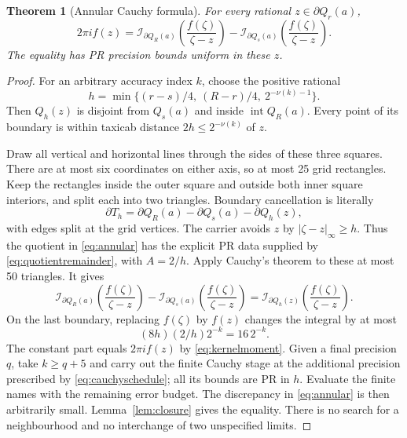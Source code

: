 \documentclass[11pt]{article}
\newtheorem{theorem}{Theorem}[section]
\theoremstyle{definition}
\newcommand{\Int}{\mathcal I}
\newcommand{\bd}{\partial}
\begin{document}
\begin{theorem}[Annular Cauchy formula]\label{thm:annular}
For every rational \(z\in\bd Q_r(a)\),
\begin{equation}\label{eq:annular}
 2\pi i f(z)=
 \Int_{\bd Q_R(a)}\!\left(\frac{f(\zeta)}{\zeta-z}\right)
 -\Int_{\bd Q_s(a)}\!\left(\frac{f(\zeta)}{\zeta-z}\right).
\end{equation}
The equality has PR precision bounds uniform in these \(z\).
\end{theorem}
\begin{proof}
For an arbitrary accuracy index \(k\), choose the positive rational
\begin{equation}\label{eq:smallh}
 h=\min\bigl\{(r-s)/4,\ (R-r)/4,\ 2^{-\nu(k)-1}\bigr\}.
\end{equation}
Then \(Q_h(z)\) is disjoint from \(Q_s(a)\) and inside
\(\operatorname{int}Q_R(a)\). Every point of its boundary is within
taxicab distance \(2h\le2^{-\nu(k)}\) of \(z\).

Draw all vertical and horizontal lines through the sides of these three
squares. There are at most six coordinates on either axis, so at most
25 grid rectangles. Keep the rectangles inside the outer square and
outside both inner square interiors, and split each into two triangles.
Boundary cancellation is literally
\[
 \bd T_h=\bd Q_R(a)-\bd Q_s(a)-\bd Q_h(z),
\]
with edges split at the grid vertices. The carrier avoids \(z\) by
\(|\zeta-z|_\infty\ge h\). Thus the quotient in
\eqref{eq:annular} has the explicit PR data supplied by
\eqref{eq:quotientremainder}, with \(A=2/h\).
Apply Cauchy's theorem to these at most 50 triangles. It gives
\begin{equation}\label{eq:annularhole}
 \Int_{\bd Q_R(a)}\!\left(\frac{f(\zeta)}{\zeta-z}\right)
 -\Int_{\bd Q_s(a)}\!\left(\frac{f(\zeta)}{\zeta-z}\right)
 =\Int_{\bd Q_h(z)}\!\left(\frac{f(\zeta)}{\zeta-z}\right).
\end{equation}
On the last boundary, replacing \(f(\zeta)\) by \(f(z)\) changes the
integral by at most
\begin{equation}\label{eq:smallerror}
 (8h)(2/h)2^{-k}=16\,2^{-k}.
\end{equation}
The constant part equals \(2\pi i f(z)\) by
\eqref{eq:kernelmoment}. Given a final precision \(q\), take
\(k\ge q+5\) and carry out the finite Cauchy stage at the additional
precision prescribed by \eqref{eq:cauchyschedule}; all its bounds are
PR in \(h\). Evaluate the finite names with the remaining error budget.
The discrepancy in \eqref{eq:annular} is then arbitrarily small.
Lemma~\ref{lem:closure} gives the equality. There is no search for a
neighbourhood and no interchange of two unspecified limits.
\end{proof}
\end{document}
